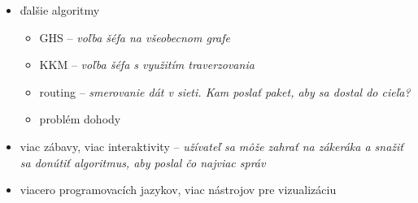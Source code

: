 \begin{itemize}
    \item ďalšie algoritmy
    \begin{itemize}
        \item GHS -- \emph{voľba šéfa na všeobecnom grafe}
        \item KKM -- \emph{voľba šéfa s využitím traverzovania}
        \item routing -- \emph{smerovanie dát v sieti. Kam poslať paket, aby sa dostal do cieľa?}
        \item problém dohody
    \end{itemize}
    \item viac zábavy, viac interaktivity -- \emph{užívateľ sa môže zahrať na zákeráka a snažiť sa
    donútiť algoritmus, aby poslal čo najviac správ}
    \item viacero programovacích jazykov, viac nástrojov pre vizualizáciu
\end{itemize}

